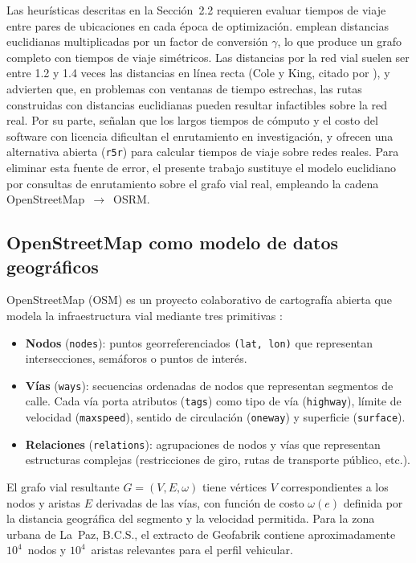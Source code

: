\documentclass[12pt,letterpaper,oneside]{book}
\begin{document}
	Las heurísticas descritas en la Sección~2.2 requieren evaluar tiempos de
	viaje entre pares de ubicaciones en cada época de optimización.
	\citet{Reyes2018} emplean distancias euclidianas multiplicadas por un
	factor de conversión $\gamma$, lo que produce un grafo completo con
	tiempos de viaje simétricos.  Las distancias por la red vial suelen ser
	entre 1.2 y 1.4 veces las distancias en línea recta (Cole y King, citado
	por \citet{Boyaci2021}), y \citet{Boyaci2021} advierten que, en problemas
	con ventanas de tiempo estrechas, las rutas construidas con distancias
	euclidianas pueden resultar infactibles sobre la red real.  Por su parte, \citet{Pereira2021}
	señalan que los largos tiempos de cómputo y el costo del software con
	licencia dificultan el enrutamiento en investigación, y ofrecen una
	alternativa abierta (\texttt{r5r}) para calcular tiempos de viaje sobre
	redes reales.  Para
	eliminar esta fuente de error, el presente trabajo sustituye el modelo
	euclidiano por consultas de enrutamiento sobre el grafo vial real,
	empleando la cadena OpenStreetMap~$\to$~OSRM.

	\subsection{OpenStreetMap como modelo de datos geográficos}

	OpenStreetMap (OSM) es un proyecto colaborativo de cartografía
	abierta que modela la infraestructura vial mediante tres primitivas
	\citep{Haklay2010, Boeing2021}:

	\begin{itemize}
		\item \textbf{Nodos} (\texttt{nodes}): puntos georreferenciados
		      \texttt{(lat, lon)} que representan intersecciones, semáforos o puntos de
		      interés.
		\item \textbf{Vías} (\texttt{ways}): secuencias ordenadas de nodos que
		      representan segmentos de calle.  Cada vía porta atributos
		      (\texttt{tags}) como tipo de vía (\texttt{highway}), límite de
		      velocidad (\texttt{maxspeed}), sentido de circulación
		      (\texttt{oneway}) y superficie (\texttt{surface}).
		\item \textbf{Relaciones} (\texttt{relations}): agrupaciones de nodos y
		      vías que representan estructuras complejas (restricciones de giro,
		      rutas de transporte público, etc.).
	\end{itemize}

	El grafo vial resultante $G = (V, E, \omega)$ tiene vértices $V$ correspondientes
	a los nodos y aristas $E$ derivadas de las vías, con función de costo $\omega(e)$
	definida por la distancia geográfica del segmento y la velocidad
	permitida.  Para la zona urbana de La~Paz, B.C.S., el extracto de
	Geofabrik contiene aproximadamente $10^4$~nodos y $10^4$~aristas
	relevantes para el perfil vehicular.
\end{document}
